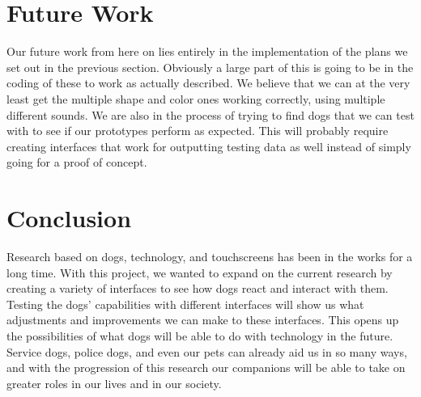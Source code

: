 \documentclass{sigchi}
\begin{document}
    \section{Future Work}
        Our future work from here on lies entirely in the implementation of the plans we set out in the previous section. Obviously a large part of this is going to be in the coding of these to work as actually described. We believe that we can at the very least get the multiple shape and color ones working correctly, using multiple different sounds. We are also in the process of trying to find dogs that we can test with to see if our prototypes perform as expected. This will probably require creating interfaces that work for outputting testing data as well instead of simply going for a proof of concept.
    
    \section{Conclusion}
        Research based on dogs, technology, and touchscreens has been in the works for a long time. With this project, we wanted to expand on the current research by creating a variety of interfaces to see how dogs react and interact with them. Testing the dogs’ capabilities with different interfaces will show us what adjustments and improvements we can make to these interfaces. This opens up the possibilities of what dogs will be able to do with technology in the future. Service dogs, police dogs, and even our pets can already aid us in so many ways, and with the progression of this research our companions will be able to take on greater roles in our lives and in our society.

    
    

    \clearpage
\end{document}
